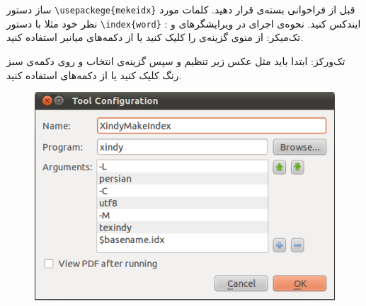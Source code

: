 \documentclass[a4paper]{article}
\begin{document}
‌ساز
دستور 
\verb|\usepackege{mekeidx}|
 قبل از  فراخوانی بسته‌ی \XePersian قرار دهید.
کلمات مورد نظر خود مثلا  با دستور \verb|\index{word}| ایندکس کنید.
نحوه‌ی اجرای    در ویرایشگرهای  و :
  تک‌میکر: از منوی  گزینه‌ی  را کلیک کنید یا از دکمه‌‌های میانبر  استفاده کنید.

  تک‌ورکز: ابتدا باید مثل عکس زیر تنظیم  و سپس گزینه‌ی   انتخاب و روی دکمه‌ی سبز رنگ کلیک کنید یا از دکمه‌های   استفاده کنید.

\begin{figure}[!h]
\centerline{\includegraphics[width=\textwidth]{Xindy_Make_Index.png}}
\end{figure}






\printindex
\end{document}
